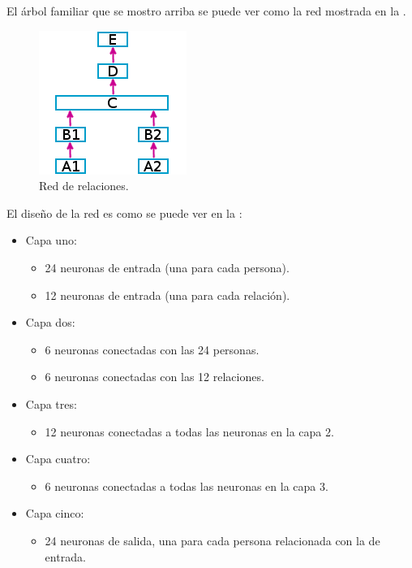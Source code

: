El árbol familiar que se mostro arriba se puede ver como la red mostrada en la .
  \begin{figure}[h]
   \centering
   \includegraphics[scale=.5]{../Figuras/Hinton/RedRelaciones.png}
   \caption{Red de relaciones.}
  \label{fig:redRelaciones}
  \end{figure}

El diseño de la red es como se puede ver en la  :

\begin{itemize}
 \item Capa uno:
 \begin{itemize}
  \item 24 neuronas de entrada (una para cada persona).
  \item 12 neuronas de entrada (una para cada relación).
 \end{itemize}
\item Capa dos:
 \begin{itemize}
  \item 6 neuronas conectadas con las 24 personas.
  \item 6 neuronas conectadas con las 12 relaciones.
 \end{itemize}
\item Capa tres:
 \begin{itemize}
  \item 12 neuronas conectadas a todas las neuronas en la capa 2.
 \end{itemize}
\item Capa cuatro:
 \begin{itemize}
  \item 6 neuronas conectadas a todas las neuronas en la capa 3.
 \end{itemize}
\item Capa cinco:
 \begin{itemize}
  \item 24 neuronas de salida, una para cada persona relacionada con la de entrada.
 \end{itemize}

\end{itemize}


